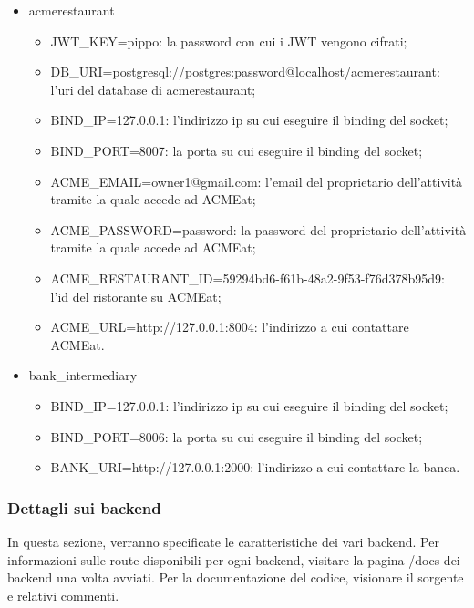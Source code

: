 \documentclass[11pt]{article} %
\begin{document}
\begin{itemize}
\begin{itemize}
\end{itemize}
\item acmerestaurant
\begin{itemize}
\item JWT\_KEY=pippo: la password con cui i JWT vengono cifrati;
\item DB\_URI=postgresql://postgres:password@localhost/acmerestaurant: l'uri del database di acmerestaurant;
\item BIND\_IP=127.0.0.1: l'indirizzo ip su cui eseguire il binding del socket;
\item BIND\_PORT=8007: la porta su cui eseguire il binding del socket;
\item ACME\_EMAIL=owner1@gmail.com: l'email del proprietario dell'attività tramite la quale accede ad ACMEat;
\item ACME\_PASSWORD=password: la password del proprietario dell'attività tramite la quale accede ad ACMEat;
\item ACME\_RESTAURANT\_ID=59294bd6-f61b-48a2-9f53-f76d378b95d9: l'id del ristorante su ACMEat;
\item ACME\_URL=http://127.0.0.1:8004: l'indirizzo a cui contattare ACMEat.
\end{itemize}
\item bank\_intermediary
\begin{itemize}
\item BIND\_IP=127.0.0.1: l'indirizzo ip su cui eseguire il binding del socket;
\item BIND\_PORT=8006: la porta su cui eseguire il binding del socket;
\item BANK\_URI=http://127.0.0.1:2000: l'indirizzo a cui contattare la banca.
\end{itemize}
\end{itemize}

\subsubsection{Dettagli sui backend}

In questa sezione, verranno specificate le caratteristiche dei vari backend. Per informazioni sulle route disponibili per ogni backend, visitare la pagina /docs dei backend una volta avviati. Per la documentazione del codice, visionare il sorgente e relativi commenti.
\end{document}
